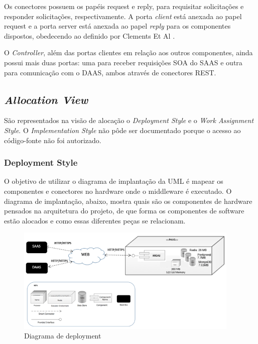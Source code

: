 \documentclass[11pt,a4paper]{article}
\begin{document}
Os conectores possuem os papéis request e reply, para requisitar solicitações e responder solicitações, respectivamente. A porta \textit{client} está anexada ao papel request e a porta server está anexada ao papel \textit{reply} para os componentes dispostos, obedecendo ao definido por Clements Et Al \cite{clements2002documenting}.

O \textit{Controller}, além das portas clientes em relação aos outros componentes, ainda possui mais duas portas: uma para receber requisições SOA do SAAS e outra para comunicação com o DAAS, ambos através de conectores REST.


\newpage
\subsection{\textit{Allocation View}}\label{sec:aloc}
\label{subsec:av}
São representados na visão de alocação o \textit{Deployment Style} e o  \textit{Work Assignment Style}. O \textit{Implementation Style} não pôde ser documentado porque o acesso ao código-fonte não foi autorizado.

\subsubsection{Deployment Style}
O objetivo de utilizar o diagrama de implantação da UML é mapear os componentes e conectores no hardware onde o middleware é executado. O diagrama de implantação, abaixo, mostra quais são os componentes de hardware pensados na arquitetura do projeto, de que forma os componentes de software estão alocados e como essas diferentes peças se relacionam.

\begin{figure}[h!]
\centering
   \includegraphics[width=0.95\textwidth]{MIDAS_-_Estilo_Deployment}
\caption{Diagrama de deployment}  \label{fig:deployment}
\end{figure}
\end{document}
